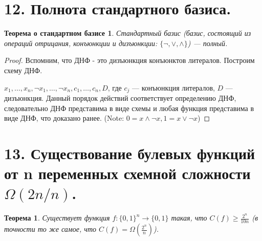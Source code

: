 \documentclass[a4paper, 12pt]{article}
\newtheorem*{standartbase}{Теорема о стандартном базисе}
\newtheorem*{existsFgthen2ndivn}{Теорема}
\begin{document}
\section*{12. Полнота стандартного базиса.}

\begin{standartbase}

 Стандартный базис (базис, состоящий из операций отрицания, конъюнкции и дизъюнкции: $\{\neg, \vee, \wedge\}$) --- полный.
 
\end{standartbase}

\begin{proof}
Вспомним, что ДНФ - это дизъюнкция конъюнктов литералов. Построим схему ДНФ.

$x_1, \ldots ,x_n, \neg x_1, \ldots ,\neg x_n, c_1, \ldots ,c_n, D$, где $c_j$ --- конъюнкция литералов, $D$ --- дизъюнкция. Данный порядок действий соответствует определению ДНФ, следовательно ДНФ представима в виде схемы и любая функция представима в виде ДНФ, что доказано ранее. (Note: $0 = x \wedge \neg x, 1 = x \vee \neg x$)
\end{proof}

\section*{13. Существование булевых функций от n переменных схемной сложности $\Omega(2n/n)$.}

\begin{existsFgthen2ndivn}
    Существует функция $f: \{0, 1\}^n \rightarrow \{0, 1\}$
    такая, что $C(f) \geqslant \frac{2^n}{10n}$ 
    (в точности то же самое, что $C(f) = \Omega(\frac{2^n}{n})$).
\end{existsFgthen2ndivn}
\end{document}
